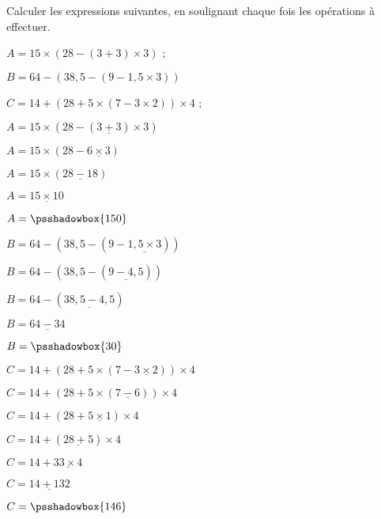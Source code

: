 \begin{exemple}[0.35]
   Calculer les expressions suivantes, en soulignant chaque fois les opérations à effectuer.
   
   $A=15\times(28-(3+3)\times 3)$ ;
   
   $B=64-(38,5-(9-1,5\times 3))$

   $C=14+(28+5\times (7-3\times 2))\times 4$ ;   
   \correction

   \bigskip
   \begin{minipage}{0.47\linewidth}
      \begin{list}{}{}
         \item $A=15\times(28-(\underline{3+3})\times 3)$
         \item $A=15\times(28-\underline{6\times 3})$
         \item $A=15\times(\underline{28-18})$
         \item $A=\underline{15\times 10}$
         \item $A=\psshadowbox{150}$
      \end{list}
   \end{minipage}      
   \begin{minipage}{0.52\linewidth}
      \begin{list}{}{}
         \item $B=64-(38,5-(9-\underline{1,5\times 3}))$
         \item $B=64-(38,5-(\underline{9-4,5}))$
         \item $B=64-(\underline{38,5-4,5})$
         \item $B=\underline{64-34}$
         \item $B=\psshadowbox{30}$
      \end{list}
   \end{minipage}

   \medskip
   \begin{minipage}{1\linewidth}
      \begin{list}{}{}
         \item $C=14+(28+5\times (7-\underline{3\times 2}))\times 4$
         \item $C=14+(28+5\times (\underline{7-6}))\times 4$
         \item $C=14+(28+\underline{5\times 1})\times 4$
         \item $C=14+(\underline{28+5})\times 4$
         \item $C=14+\underline{33\times 4}$
         \item $C=\underline{14+132}$
         \item $C=\psshadowbox{146}$      
      \end{list}
   \end{minipage}   
\end{exemple}

